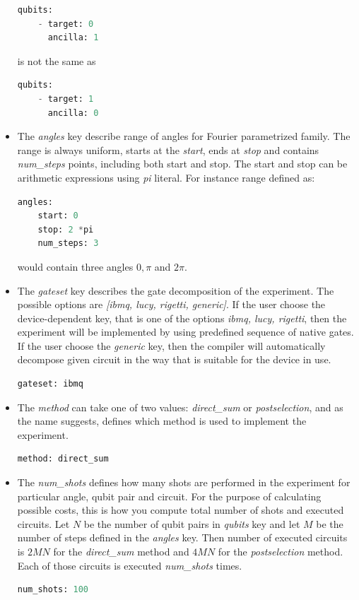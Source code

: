 \documentclass[preprint,12pt, a4paper, dvipsnames]{elsarticle}
\newcommand{\1}{{\rm 1\hspace{-0.9mm}l}}
\begin{document}
\begin{itemize}
	
	\begin{lstlisting}[language=Python]
qubits:
	- target: 0
      ancilla: 1
	\end{lstlisting}
	is not the same as 
	\begin{lstlisting}[language=Python]
qubits:
	- target: 1
      ancilla: 0
	\end{lstlisting}
\item The \textit{angles} key describe range of angles for Fourier parametrized family. The range is always uniform, starts at the \textit{start}, ends at \textit{stop} and contains \textit{num\_steps} points, including both start and stop. The start and stop can be arithmetic expressions using \textit{pi} literal. For instance range defined as:  
\begin{lstlisting}[language=Python]
angles:
	start: 0
	stop: 2 *pi
	num_steps: 3
\end{lstlisting}
 would contain three angles $0, \pi$  and $2\pi$.
 \item 
 The \textit{gateset} key describes the gate decomposition of the experiment. The possible options are \textit{[ibmq, lucy, rigetti, generic]}. If the user choose the device-dependent key, that is one of the options \textit{ibmq, lucy, rigetti}, then the experiment will be implemented by using predefined sequence of native gates. If the user choose the \textit{generic} key, then the compiler  will automatically decompose given circuit in the way that is suitable for the device in use.
 \begin{lstlisting}[language=Python]
gateset: ibmq
 \end{lstlisting}
 \item The \textit{method} can take one of two values: \textit{direct\_sum} or \textit{postselection}, and as the name suggests, defines which method is used to implement the experiment.
 \begin{lstlisting}[language=Python]
method: direct_sum
 \end{lstlisting}
 \item The \textit{num\_shots} defines how many shots are performed in the experiment for particular angle, qubit pair and circuit. For the purpose of calculating possible costs, this is how you compute total number of shots and executed circuits. Let $N$ be the number of qubit pairs in \textit{qubits} key and let $M$ be the number of steps defined in the \textit{angles} key. Then number of executed circuits is $2MN$ for the \textit{direct\_sum} method and $4MN$ for the \textit{postselection} method. Each of those circuits is executed \textit{num\_shots} times.
 \begin{lstlisting}[language=Python]
num_shots: 100
 \end{lstlisting}
\end{itemize}
\end{document}
